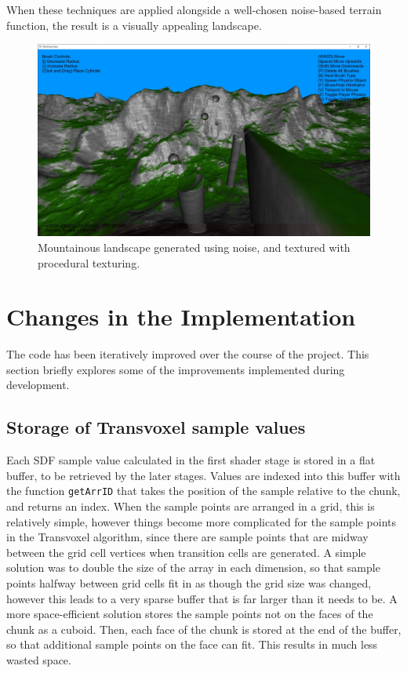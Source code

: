\documentclass[11pt]{article}
\begin{document}
When these techniques are applied alongside a well-chosen noise-based terrain function, the result is a visually appealing landscape.
\begin{figure}[H]
  \includegraphics[width=\textwidth]{shaded_mountains.jpg}
  \caption{Mountainous landscape generated using noise, and textured with procedural texturing. }
  \label{fig:shaded_mountainsd}
\end{figure}


\section{Changes in the Implementation}
The code has been iteratively improved over the course of the project. This section briefly explores some of the improvements implemented during development.

\subsection{Storage of Transvoxel sample values}

Each SDF sample value calculated in the first shader stage is stored in a flat buffer, to be retrieved by the later stages. Values are indexed into this buffer with the function \texttt{getArrID} that takes the position of the sample relative to the chunk, and returns an index. When the sample points are arranged in a grid, this is relatively simple, however things become more complicated for the sample points in the Transvoxel algorithm, since there are sample points that are midway between the grid cell vertices when transition cells are generated. A simple solution was to double the size of the array in each dimension, so that sample points halfway between grid cells fit in as though the grid size was changed, however this leads to a very sparse buffer that is far larger than it needs to be. A more space-efficient solution stores the sample points not on the faces of the chunk as a cuboid. Then, each face of the chunk is stored at the end of the buffer, so that additional sample points on the face can fit. This results in much less wasted space.
\end{document}
